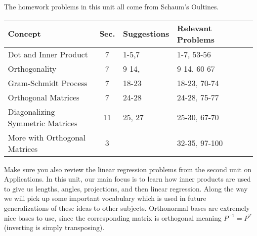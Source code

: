





The homework problems in this unit all come from Schaum's Oultines. 
\begin{center}
\begin{tabular}{|l|c|l|l|l|l|}
\hline
Concept&Sec.&Suggestions&Relevant Problems\\ \hline
Dot and Inner Product&7&1-5,7&1-7, 53-56\\ \hline
Orthogonality&7&9-14,&9-14, 60-67\\ \hline
Gram-Schmidt Process&7&18-23&18-23, 70-74\\ \hline
Orthogonal Matrices&7&24-28&24-28, 75-77\\ \hline
Diagonalizing Symmetric Matrices&11&25, 27&25-30, 67-70\\ \hline
More with Orthogonal Matrices&3&&32-35, 97-100\\ \hline
\end{tabular}
\end{center}
Make sure you also review the linear regression problems from the second unit on Applications.  In this unit, our main focus is to learn how inner products are used to give us lengths, angles, projections, and then linear regression. Along the way we will pick up some important vocabulary which is used in future generalizations of these ideas to other subjects.  Orthonormal bases are extremely nice bases to use, since the corresponding matrix is orthogonal meaning $P^{-1}=P^T$ (inverting is simply transposing).



